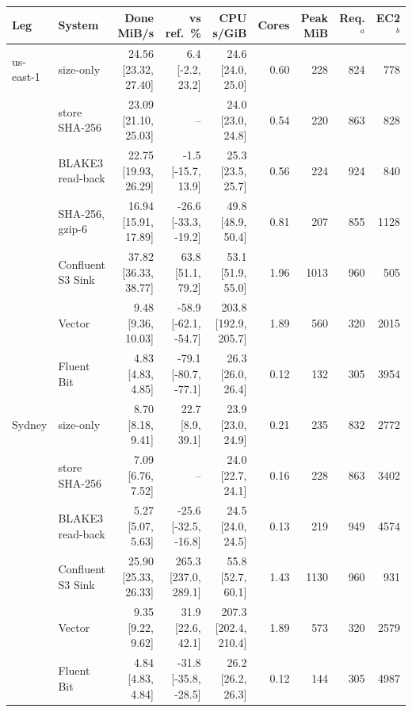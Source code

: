 
\begin{tabular}{@{}llrrrrrrr@{}}
\toprule
Leg & System & Done MiB/s & vs ref.\ \% & CPU s/GiB & Cores & Peak MiB & Req.$^a$ & EC2$^b$ \\
\midrule
us-east-1 & \sysname{} size-only & 24.56 [23.32, 27.40] & 6.4 [-2.2, 23.2] & 24.6 [24.0, 25.0] & 0.60 & 228 & 824 & 778 \\
 & \sysname{} store SHA-256 & 23.09 [21.10, 25.03] & -- & 24.0 [23.0, 24.8] & 0.54 & 220 & 863 & 828 \\
 & \sysname{} BLAKE3 read-back & 22.75 [19.93, 26.29] & -1.5 [-15.7, 13.9] & 25.3 [23.5, 25.7] & 0.56 & 224 & 924 & 840 \\
 & \sysname{} SHA-256, gzip-6 & 16.94 [15.91, 17.89] & -26.6 [-33.3, -19.2] & 49.8 [48.9, 50.4] & 0.81 & 207 & 855 & 1128 \\
 & Confluent S3 Sink & 37.82 [36.33, 38.77] & 63.8 [51.1, 79.2] & 53.1 [51.9, 55.0] & 1.96 & 1013 & 960 & 505 \\
 & Vector & 9.48 [9.36, 10.03] & -58.9 [-62.1, -54.7] & 203.8 [192.9, 205.7] & 1.89 & 560 & 320 & 2015 \\
 & Fluent Bit & 4.83 [4.83, 4.85] & -79.1 [-80.7, -77.1] & 26.3 [26.0, 26.4] & 0.12 & 132 & 305 & 3954 \\
\addlinespace[1pt]
Sydney & \sysname{} size-only & 8.70 [8.18, 9.41] & 22.7 [8.9, 39.1] & 23.9 [23.0, 24.9] & 0.21 & 235 & 832 & 2772 \\
 & \sysname{} store SHA-256 & 7.09 [6.76, 7.52] & -- & 24.0 [22.7, 24.1] & 0.16 & 228 & 863 & 3402 \\
 & \sysname{} BLAKE3 read-back & 5.27 [5.07, 5.63] & -25.6 [-32.5, -16.8] & 24.5 [24.0, 24.5] & 0.13 & 219 & 949 & 4574 \\
 & Confluent S3 Sink & 25.90 [25.33, 26.33] & 265.3 [237.0, 289.1] & 55.8 [52.7, 60.1] & 1.43 & 1130 & 960 & 931 \\
 & Vector & 9.35 [9.22, 9.62] & 31.9 [22.6, 42.1] & 207.3 [202.4, 210.4] & 1.89 & 573 & 320 & 2579 \\
 & Fluent Bit & 4.84 [4.83, 4.84] & -31.8 [-35.8, -28.5] & 26.2 [26.2, 26.3] & 0.12 & 144 & 305 & 4987 \\
\bottomrule
\end{tabular}
